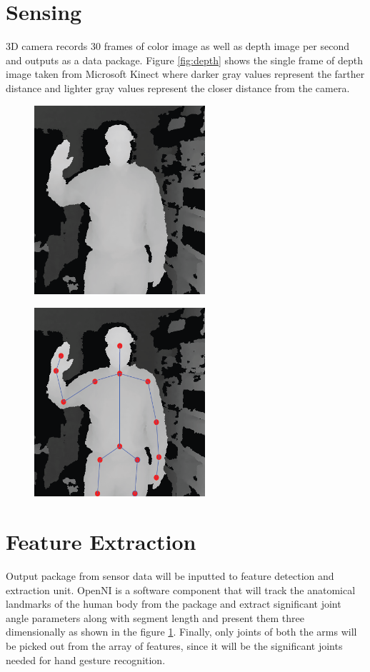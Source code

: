 \section{Sensing} 
3D camera records 30 frames of color image as well as depth image per second and outputs as a data package. Figure \ref{fig:depth} shows the single frame of depth image taken from Microsoft Kinect where darker gray values represent the farther distance and lighter gray values represent the closer distance from the camera.

\begin{figure}
	\centering
	\begin{minipage}{.5\textwidth}
		\centering
\includegraphics[height=7cm]{figures/depth.png} 
		\label{fig:depth}
	\end{minipage}%
	\begin{minipage}{.5\textwidth}
		\centering
		\includegraphics[height=7cm]{figures/depth-skeleton.png}
		\label{fig:skeleton}
	\end{minipage}
\end{figure}

\section{Feature Extraction}
Output package from sensor data will be inputted to feature detection and extraction unit. OpenNI is a software component that will track the anatomical landmarks of the human body from the package and extract significant joint angle parameters along with segment length and present them three dimensionally as shown in the figure \ref{fig:skeleton}. Finally, only joints of both the arms will be picked out from the array of features, since it will be the significant joints needed for hand gesture recognition.

